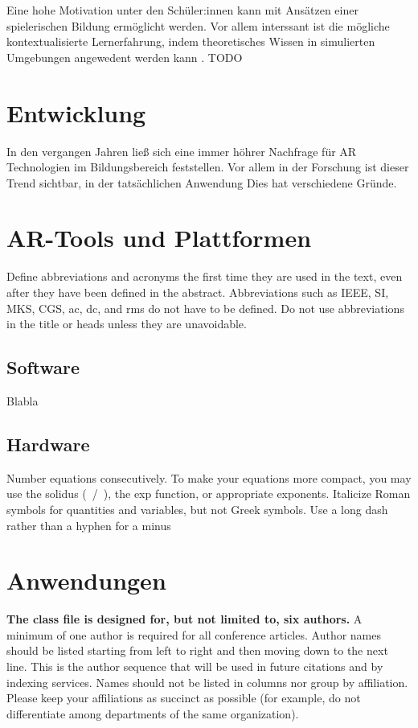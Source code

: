 \documentclass[conference]{IEEEtran}
\begin{document}
Eine hohe Motivation unter den Schüler:innen 
kann mit Ansätzen einer spielerischen Bildung ermöglicht werden. Vor allem interssant ist 
die mögliche kontextualisierte Lernerfahrung, indem theoretisches Wissen in simulierten 
Umgebungen angewedent werden kann \cite{b2}. TODO

\section{Entwicklung}
In den vergangen Jahren ließ sich eine immer höhrer Nachfrage für AR Technologien im Bildungsbereich
feststellen. Vor allem in der Forschung ist dieser Trend sichtbar, in der tatsächlichen Anwendung
Dies hat verschiedene Gründe. 

\section{AR-Tools und Plattformen}\label{AA}
Define abbreviations and acronyms the first time they are used in the text, 
even after they have been defined in the abstract. Abbreviations such as 
IEEE, SI, MKS, CGS, ac, dc, and rms do not have to be defined. Do not use 
abbreviations in the title or heads unless they are unavoidable.

\subsection{Software}
Blabla

\subsection{Hardware}
Number equations consecutively. To make your 
equations more compact, you may use the solidus (~/~), the exp function, or 
appropriate exponents. Italicize Roman symbols for quantities and variables, 
but not Greek symbols. Use a long dash rather than a hyphen for a minus 


\section{Anwendungen}
\textbf{The class file is designed for, but not limited to, six authors.} A 
minimum of one author is required for all conference articles. Author names 
should be listed starting from left to right and then moving down to the 
next line. This is the author sequence that will be used in future citations 
and by indexing services. Names should not be listed in columns nor group by 
affiliation. Please keep your affiliations as succinct as possible (for 
example, do not differentiate among departments of the same organization).
\end{document}
